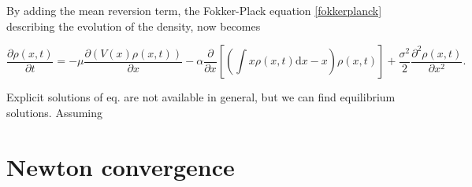 \documentclass[]{article}
\newcommand{\pa}[2]{\frac{\partial #1}{\partial #2}}
\newcommand{\ppa}[2]{\frac{\partial^2 #1}{\partial #2^2}}
\theoremstyle{definition}
\begin{document}
%
%


By adding the mean reversion term, the Fokker-Plack equation \eqref{fokkerplanck}  describing the evolution of the density, now becomes

\begin{equation}
\label{fp_mean_field}
\pa{\rho(x,t)}{t} = - \mu \pa{( V(x) \rho(x,t))}{x} - \alpha \pa{}{x} \left[ \left(\int x \rho(x,t) \mathrm{d}x  -x \right) \rho(x,t) \right] + \frac{\sigma^2}{2}  \ppa{\rho(x,t)}{x} .
\end{equation}

Explicit solutions of eq. \label{fp_mean_field} are not available in general, but we can find equilibrium solutions. Assuming 





\section{Newton convergence}





\end{document}

